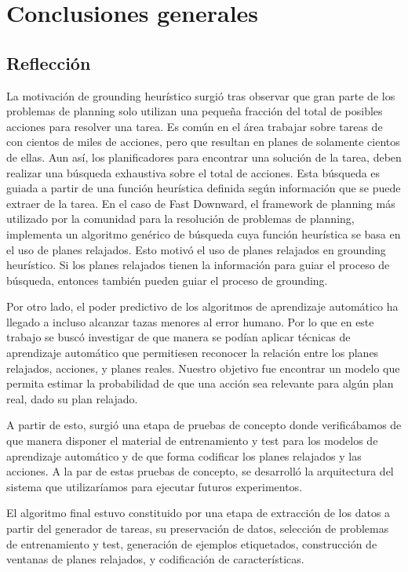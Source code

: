 \chapter{Conclusiones generales}
\label{ch:con}

\section{Reflección}

La motivación de grounding heurístico surgió tras observar que gran parte de los
problemas de planning solo utilizan una pequeña fracción del total de posibles
acciones para resolver una tarea. Es común en el área trabajar sobre tareas de
con cientos de miles de acciones, pero que resultan en planes de solamente
cientos de ellas. Aun así, los planificadores para encontrar una solución de la
tarea, deben realizar una búsqueda exhaustiva sobre el total de acciones. Esta
búsqueda es guiada a partir de una función heurística definida según
información que se puede extraer de la tarea. En el caso de Fast Downward, el
framework de planning más utilizado por la comunidad para la resolución de
problemas de planning, implementa un algoritmo genérico de búsqueda cuya función
heurística se basa en el uso de planes relajados. Esto motivó el uso de planes
relajados en grounding heurístico. Si los planes relajados tienen la información
para guiar el proceso de búsqueda, entonces también pueden guiar el proceso de
grounding.

Por otro lado, el poder predictivo de los algoritmos de aprendizaje automático
ha llegado a incluso alcanzar tazas menores al error humano. Por lo que en este
trabajo se buscó investigar de que manera se podían aplicar técnicas de
aprendizaje automático que permitiesen reconocer la relación entre los planes
relajados, acciones, y planes reales. Nuestro objetivo fue encontrar un modelo
que permita estimar la probabilidad de que una acción sea relevante para algún
plan real, dado su plan relajado.

A partir de esto, surgió una etapa de pruebas de concepto donde verificábamos de
que manera disponer el material de entrenamiento y test para los modelos de
aprendizaje automático y de que forma codificar los planes relajados y las
acciones. A la par de estas pruebas de concepto, se desarrolló la arquitectura
del sistema que utilizaríamos para ejecutar futuros experimentos.

El algoritmo final estuvo constituido por una etapa de extracción de los datos a
partir del generador de tareas, su preservación de datos, selección de problemas
de entrenamiento y test, generación de ejemplos etiquetados, construcción de
ventanas de planes relajados, y codificación de características.


